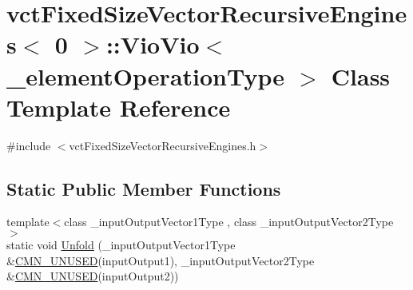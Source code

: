 \hypertarget{classvct_fixed_size_vector_recursive_engines_3_010_01_4_1_1_vio_vio}{\section{vct\-Fixed\-Size\-Vector\-Recursive\-Engines$<$ 0 $>$\-:\-:Vio\-Vio$<$ \-\_\-element\-Operation\-Type $>$ Class Template Reference}
\label{classvct_fixed_size_vector_recursive_engines_3_010_01_4_1_1_vio_vio}
}


{\ttfamily \#include $<$vct\-Fixed\-Size\-Vector\-Recursive\-Engines.\-h$>$}

\subsection*{Static Public Member Functions}
\begin{DoxyCompactItemize}
\item 
{\footnotesize template$<$class \-\_\-input\-Output\-Vector1\-Type , class \-\_\-input\-Output\-Vector2\-Type $>$ }\\static void \hyperlink{classvct_fixed_size_vector_recursive_engines_3_010_01_4_1_1_vio_vio_ab4e34c3396a64e443eb6d518a8950ece}{Unfold} (\-\_\-input\-Output\-Vector1\-Type \&\hyperlink{cmn_portability_8h_a021894e2626935fa2305434b1e893ff6}{C\-M\-N\-\_\-\-U\-N\-U\-S\-E\-D}(input\-Output1), \-\_\-input\-Output\-Vector2\-Type \&\hyperlink{cmn_portability_8h_a021894e2626935fa2305434b1e893ff6}{C\-M\-N\-\_\-\-U\-N\-U\-S\-E\-D}(input\-Output2))
\end{DoxyCompactItemize}


